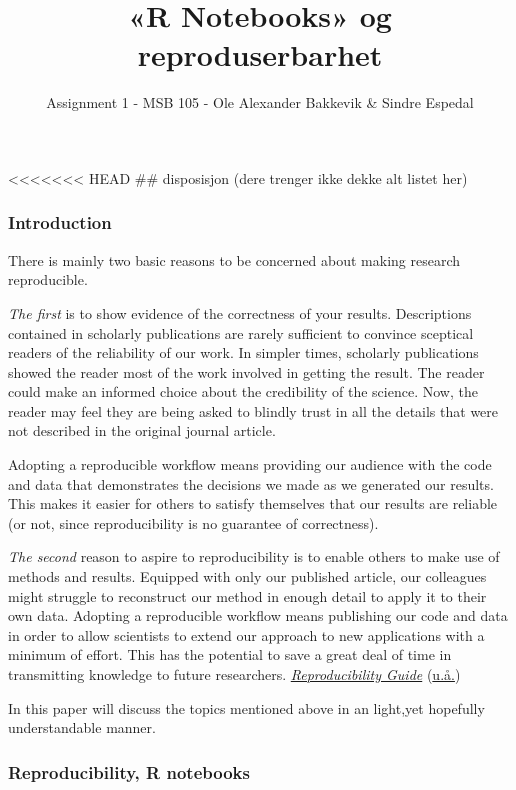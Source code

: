 \documentclass[
  12pt,
  norsk,
]{article}
\title{«R Notebooks» og reproduserbarhet}
\author{Assignment 1 - MSB 105 - Ole Alexander Bakkevik \& Sindre
Espedal}
\date{}
\begin{document}
\maketitle

\textless\textless\textless\textless\textless\textless\textless{} HEAD
\#\# disposisjon (dere trenger ikke dekke alt listet her)

\hypertarget{introduction}{%
\subsubsection{Introduction}\label{introduction}}

There is mainly two basic reasons to be concerned about making research
reproducible.

\emph{The first} is to show evidence of the correctness of your results.
Descriptions contained in scholarly publications are rarely sufficient
to convince sceptical readers of the reliability of our work. In simpler
times, scholarly publications showed the reader most of the work
involved in getting the result. The reader could make an informed choice
about the credibility of the science. Now, the reader may feel they are
being asked to blindly trust in all the details that were not described
in the original journal article.

Adopting a reproducible workflow means providing our audience with the
code and data that demonstrates the decisions we made as we generated
our results. This makes it easier for others to satisfy themselves that
our results are reliable (or not, since reproducibility is no guarantee
of correctness).

\emph{The second} reason to aspire to reproducibility is to enable
others to make use of methods and results. Equipped with only our
published article, our colleagues might struggle to reconstruct our
method in enough detail to apply it to their own data. Adopting a
reproducible workflow means publishing our code and data in order to
allow scientists to extend our approach to new applications with a
minimum of effort. This has the potential to save a great deal of time
in transmitting knowledge to future researchers.
\protect\hyperlink{ref-Git-reproducabilty}{\emph{Reproducibility Guide}}
(\protect\hyperlink{ref-Git-reproducabilty}{u.å.})

In this paper will discuss the topics mentioned above in an light,yet
hopefully understandable manner.

\hypertarget{reproducibility-r-notebooks}{%
\subsubsection{Reproducibility, R
notebooks}\label{reproducibility-r-notebooks}}
\end{document}
